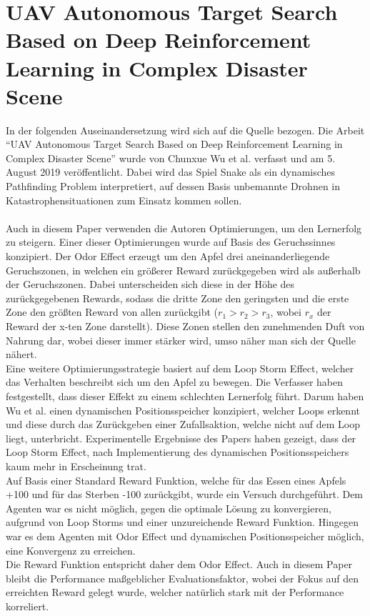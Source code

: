 \section{UAV Autonomous Target Search Based on Deep Reinforcement Learning in Complex Disaster Scene} \label{sec:Verwandte_Arbeiten_Paper_2}
In der folgenden Auseinandersetzung wird sich auf die Quelle \cite{UAV} bezogen.
Die Arbeit "`UAV Autonomous Target Search Based on Deep Reinforcement Learning in Complex Disaster Scene"' wurde von Chunxue Wu et al. verfasst und am 5. August 2019 veröffentlicht. Dabei wird das Spiel Snake als ein dynamisches Pathfinding Problem interpretiert, auf dessen Basis unbemannte Drohnen in Katastrophensituationen zum Einsatz kommen sollen.\\
\\Auch in diesem Paper verwenden die Autoren Optimierungen, um den Lernerfolg zu steigern.
Einer dieser Optimierungen wurde auf Basis des Geruchssinnes konzipiert. Der Odor Effect erzeugt um den Apfel drei aneinanderliegende Geruchszonen, in welchen ein größerer Reward zurückgegeben wird als außerhalb der Geruchszonen. Dabei unterscheiden sich diese in der Höhe des zurückgegebenen Rewards, sodass die dritte Zone den geringsten und die erste Zone den größten Reward von allen zurückgibt ($r_1 > r_2 > r_3$, wobei $r_x$ der Reward der x-ten Zone darstellt).
Diese Zonen stellen den zunehmenden Duft von Nahrung dar, wobei dieser immer stärker wird, umso näher man sich der Quelle nähert.\\
Eine weitere Optimierungsstrategie basiert auf dem Loop Storm Effect, welcher das Verhalten beschreibt sich um den Apfel zu bewegen. Die Verfasser haben festgestellt, dass dieser Effekt zu einem schlechten Lernerfolg führt. Darum haben Wu et al. einen dynamischen Positionsspeicher konzipiert, welcher Loops erkennt und diese durch das Zurückgeben einer Zufallsaktion, welche nicht auf dem Loop liegt, unterbricht. Experimentelle Ergebnisse des Papers haben gezeigt, dass der Loop Storm Effect, nach Implementierung des dynamischen Positionsspeichers kaum mehr in Erscheinung trat.\\
Auf Basis einer Standard Reward Funktion, welche für das Essen eines Apfels +100 und für das Sterben -100 zurückgibt, wurde ein Versuch durchgeführt. Dem Agenten war es nicht möglich, gegen die optimale Lösung zu konvergieren, aufgrund von Loop Storms und einer unzureichende Reward Funktion. Hingegen war es dem Agenten mit Odor Effect und dynamischen Positionsspeicher möglich, eine Konvergenz zu erreichen.\\
Die Reward Funktion entspricht daher dem Odor Effect.
Auch in diesem Paper bleibt die Performance maßgeblicher Evaluationsfaktor, wobei der Fokus auf den erreichten Reward gelegt wurde, welcher natürlich stark mit der Performance korreliert.


